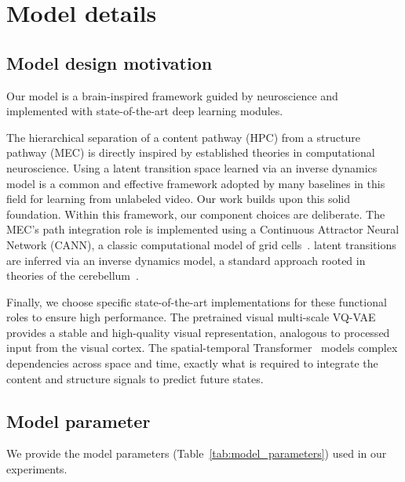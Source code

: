 \newpage
\section{Model details}
\label{appendix:model_details}
\subsection{Model design motivation}
Our model is a brain-inspired framework guided by neuroscience and implemented with state-of-the-art deep learning modules. 

The hierarchical separation of a content pathway (HPC) from a structure pathway (MEC) is directly inspired by established theories in computational neuroscience. Using a latent transition space learned via an inverse dynamics model is a common and effective framework adopted by many baselines in this field for learning from unlabeled video. Our work builds upon this solid foundation.
Within this framework, our component choices are deliberate. The MEC's path integration role is implemented using a Continuous Attractor Neural Network (CANN), a classic computational model of grid cells~\citep{gardnerToroidalTopologyPopulation2022,mcnaughtonPathIntegrationNeural2006a,fuhsSpinGlassModel2006a,burgessOscillatoryInterferenceModel2007a}. latent transitions are inferred via an inverse dynamics model, a standard approach rooted in theories of the cerebellum~\citep{wolpertInternalModelsCerebellum1998}. 

Finally, we choose specific state-of-the-art implementations for these functional roles to ensure high performance. The pretrained visual multi-scale VQ-VAE~\citep{tianVisualAutoregressiveModeling2024} provides a stable and high-quality visual representation, analogous to processed input from the visual cortex. The spatial-temporal Transformer~\citep{bruceGenieGenerativeInteractive2024,yeLatentActionPretraining2024} models complex dependencies across space and time, exactly what is required to integrate the content and structure signals to predict future states. 

\subsection{Model parameter}
We provide the model parameters (Table~\ref{tab:model_parameters}) used in our experiments. 

